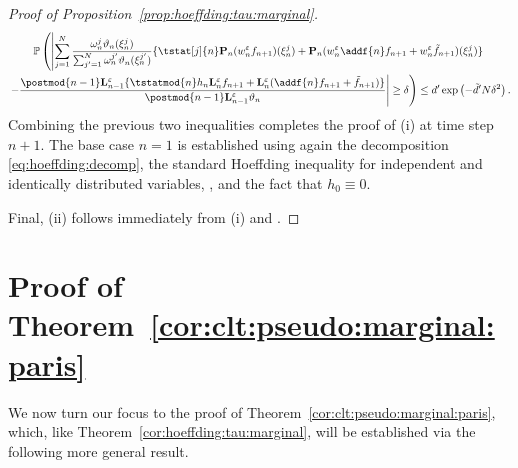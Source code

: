 \begin{proof}[Proof of Proposition~\ref{prop:hoeffding:tau:marginal}]
\begin{multline*}
\pP \left( \left|  \sum_{j = 1}^\N 
\frac{\ewght{n}{j} \adjfuncforward{n}(\epart{n}{j})}{\sum_{j' = 1}^\N \ewght{n}{j'} \adjfuncforward{n}(\epart{n}{j'})} \{ \tstat[j]{n} \prop{n} (\wgtfuncmod{n} f_{n + 1})(\epart{n}{j}) + \prop{n}(\wgtfuncmod{n} \addf{n} f_{n + 1} + \wgtfuncmod{n} \ftd{n + 1})(\epart{n}{j})\} \right. \right. \\
\left. \left. - \frac{\postmod{n - 1} \ukmod{n - 1}\{\tstatmod{n} h_n \ukmod{n} f_{n + 1} + \ukmod{n} (\addf{n} f_{n + 1} + \ftd{n + 1})\}}{\postmod{n - 1} \ukmod{n - 1} \adjfuncforward{n}} \right| \geq \delta \right) \leq d' \exp \left( - \tilde{d}' N \delta^2 \right).  
\end{multline*}
Combining the previous two inequalities completes the proof of (i) at time step $n + 1$. The base case $n = 1$ is established using again the decomposition \eqref{eq:hoeffding:decomp}, the standard Hoeffding inequality for independent and identically distributed variables, \cite[Lemma~4]{douc:garivier:moulines:olsson:2010}, and the fact that $h_0 \equiv 0$.   

Final, (ii) follows immediately from (i) and \cite[Lemma~4]{douc:garivier:moulines:olsson:2010}.
\end{proof} 


\section{Proof of Theorem~\ref{cor:clt:pseudo:marginal:paris}}
\label{sec:proof:prop:clt:pseudo:marginal:paris}

We now turn our focus to the proof of Theorem~\ref{cor:clt:pseudo:marginal:paris}, which, like Theorem~\ref{cor:hoeffding:tau:marginal}, will be established via the following more general result. 

